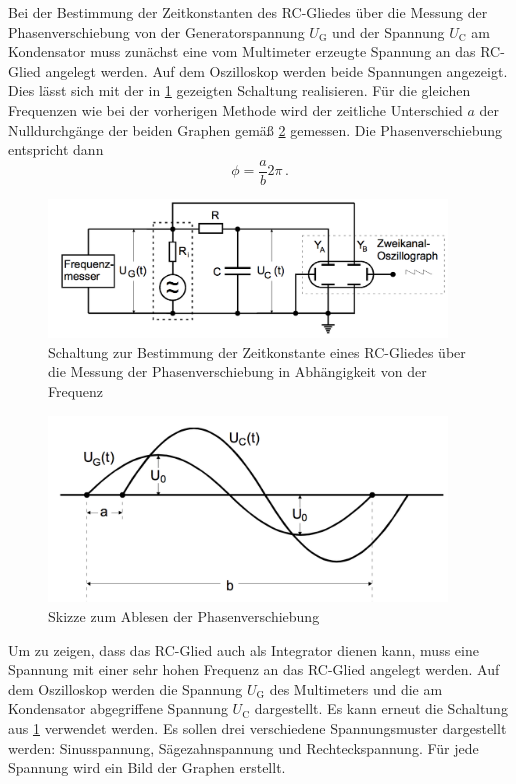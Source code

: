 Bei der Bestimmung der Zeitkonstanten des RC-Gliedes über die Messung der Phasenverschiebung
von der Generatorspannung $U_{\text{G}}$ und der Spannung $U_{\text{C}}$ am Kondensator
muss zunächst eine vom Multimeter erzeugte Spannung an das RC-Glied angelegt werden.
Auf dem Oszilloskop werden beide Spannungen angezeigt. Dies lässt sich mit der in \ref{fig:Schaltung_4c}
gezeigten Schaltung realisieren. Für die gleichen Frequenzen wie bei der vorherigen
Methode wird der zeitliche Unterschied $a$ der Nulldurchgänge der beiden Graphen gemäß
\ref{fig:phasenverschiebung} gemessen. Die Phasenverschiebung entspricht dann
\begin{equation}
  \phi=\frac{a}{b}2\pi\,.
\end{equation}

\begin{figure}
  \centering
  \includegraphics[width=300pt]{data/4c_schaltung.png}
  \caption{Schaltung zur Bestimmung der Zeitkonstante eines RC-Gliedes über die Messung
  der Phasenverschiebung in Abhängigkeit von der Frequenz \cite{Versuchsanleitung}}
  \label{fig:Schaltung_4c}
\end{figure}

\begin{figure}
  \centering
  \includegraphics[width=300pt]{data/phasenverschiebung.png}
  \caption{Skizze zum Ablesen der Phasenverschiebung \cite{Versuchsanleitung}}
  \label{fig:phasenverschiebung}
\end{figure}

Um zu zeigen, dass das RC-Glied auch als Integrator dienen kann, muss eine Spannung
mit einer sehr hohen Frequenz an das RC-Glied angelegt werden.
Auf dem Oszilloskop werden die Spannung $U_{\text{G}}$ des Multimeters und
die am Kondensator abgegriffene Spannung $U_{\text{C}}$ dargestellt. Es kann erneut die Schaltung
aus \ref{fig:Schaltung_4c} verwendet werden. Es sollen drei verschiedene
Spannungsmuster dargestellt werden: Sinusspannung, Sägezahnspannung und Rechteckspannung.
Für jede Spannung wird ein Bild der Graphen erstellt.
